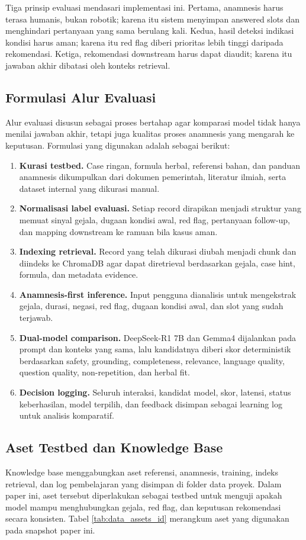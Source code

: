 \documentclass[conference]{IEEEtran}
\begin{document}
Tiga prinsip evaluasi mendasari implementasi ini. Pertama, anamnesis harus terasa humanis, bukan robotik; karena itu sistem menyimpan answered slots dan menghindari pertanyaan yang sama berulang kali. Kedua, hasil deteksi indikasi kondisi harus aman; karena itu red flag diberi prioritas lebih tinggi daripada rekomendasi. Ketiga, rekomendasi downstream harus dapat diaudit; karena itu jawaban akhir dibatasi oleh konteks retrieval.

\subsection{Formulasi Alur Evaluasi}
Alur evaluasi disusun sebagai proses bertahap agar komparasi model tidak hanya menilai jawaban akhir, tetapi juga kualitas proses anamnesis yang mengarah ke keputusan. Formulasi yang digunakan adalah sebagai berikut:
\begin{enumerate}
\item \textbf{Kurasi testbed.} Case ringan, formula herbal, referensi bahan, dan panduan anamnesis dikumpulkan dari dokumen pemerintah, literatur ilmiah, serta dataset internal yang dikurasi manual.
\item \textbf{Normalisasi label evaluasi.} Setiap record dirapikan menjadi struktur yang memuat sinyal gejala, dugaan kondisi awal, red flag, pertanyaan follow-up, dan mapping downstream ke ramuan bila kasus aman.
\item \textbf{Indexing retrieval.} Record yang telah dikurasi diubah menjadi chunk dan diindeks ke ChromaDB agar dapat diretrieval berdasarkan gejala, case hint, formula, dan metadata evidence.
\item \textbf{Anamnesis-first inference.} Input pengguna dianalisis untuk mengekstrak gejala, durasi, negasi, red flag, dugaan kondisi awal, dan slot yang sudah terjawab.
\item \textbf{Dual-model comparison.} DeepSeek-R1 7B dan Gemma4 dijalankan pada prompt dan konteks yang sama, lalu kandidatnya diberi skor deterministik berdasarkan safety, grounding, completeness, relevance, language quality, question quality, non-repetition, dan herbal fit.
\item \textbf{Decision logging.} Seluruh interaksi, kandidat model, skor, latensi, status keberhasilan, model terpilih, dan feedback disimpan sebagai learning log untuk analisis komparatif.
\end{enumerate}

\subsection{Aset Testbed dan Knowledge Base}
Knowledge base menggabungkan aset referensi, anamnesis, training, indeks retrieval, dan log pembelajaran yang disimpan di folder data proyek. Dalam paper ini, aset tersebut diperlakukan sebagai testbed untuk menguji apakah model mampu menghubungkan gejala, red flag, dan keputusan rekomendasi secara konsisten. Tabel \ref{tab:data_assets_id} merangkum aset yang digunakan pada snapshot paper ini.
\end{document}
